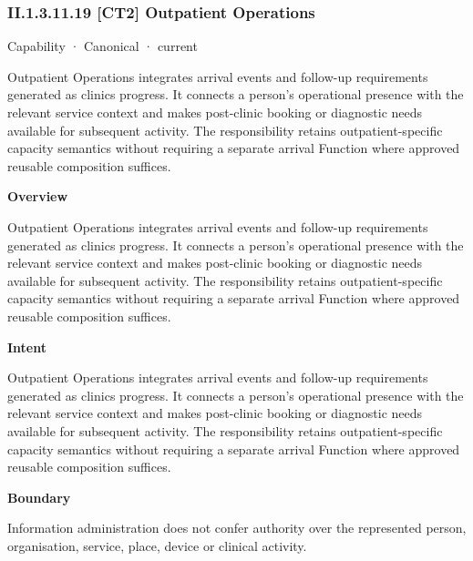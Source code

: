 \subsubsection*{II.1.3.11.19 [CT2] Outpatient Operations}
\label{navigation:II.1.3.11.19}

\label{element:21399d52b9624ddfbeb786f1d72e40c3}
{\small Capability · Canonical · current}\par

Outpatient Operations integrates arrival events and follow-up requirements generated as clinics progress. It connects a person's operational presence with the relevant service context and makes post-clinic booking or diagnostic needs available for subsequent activity. The responsibility retains outpatient-specific capacity semantics without requiring a separate arrival Function where approved reusable composition suffices.



\textbf{Overview}



Outpatient Operations integrates arrival events and follow-up requirements generated as clinics progress. It connects a person's operational presence with the relevant service context and makes post-clinic booking or diagnostic needs available for subsequent activity. The responsibility retains outpatient-specific capacity semantics without requiring a separate arrival Function where approved reusable composition suffices.



\textbf{Intent}



Outpatient Operations integrates arrival events and follow-up requirements generated as clinics progress. It connects a person's operational presence with the relevant service context and makes post-clinic booking or diagnostic needs available for subsequent activity. The responsibility retains outpatient-specific capacity semantics without requiring a separate arrival Function where approved reusable composition suffices.



\textbf{Boundary}



Information administration does not confer authority over the represented person, organisation, service, place, device or clinical activity.



